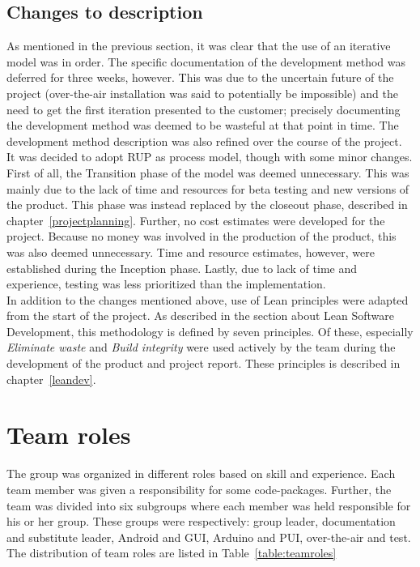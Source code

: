 \subsection{Changes to description}
\label{sec:changes-desc}
As mentioned in the previous section, it was clear that the use of an iterative model was in order. The specific documentation of the development method was deferred for three weeks, however. This was due to the uncertain future of the project (over-the-air installation was said to potentially be impossible) and the need to get the first iteration presented to the customer; precisely documenting the development method was deemed to be wasteful at that point in time. The development method description was also refined over the course of the project.\\
\newpage
It was decided to adopt RUP as process model, though with some minor changes. First of all, the Transition phase of the model was deemed unnecessary. This was mainly due to the lack of time and resources for beta testing and new versions of the product. This phase was instead replaced by the closeout phase, described in chapter~\ref{projectplanning}. Further, no cost estimates were developed for the project. Because no money was involved in the production of the product, this was also deemed unnecessary. Time and resource estimates, however, were established during the Inception phase. Lastly, due to lack of time and experience, testing was less prioritized than the implementation.  \\
\newline
In addition to the changes mentioned above, use of Lean principles were adapted from the start of the project. As described in the section about Lean Software Development, this methodology is defined by seven principles. Of these, especially \emph{Eliminate waste} and \emph{Build integrity} were used actively by the team during the development of the product and project report. These principles is described in chapter~\ref{leandev}.

\section{Team roles}
The group was organized in different roles based on skill and experience. Each team member was given a responsibility for some code-packages. Further, the team was divided into six subgroups where each member was held responsible for his or her group. These groups were respectively: group leader, documentation and substitute leader, Android and GUI, Arduino and PUI, over-the-air and test.
The distribution of team roles are listed in Table~\ref{table:teamroles}

